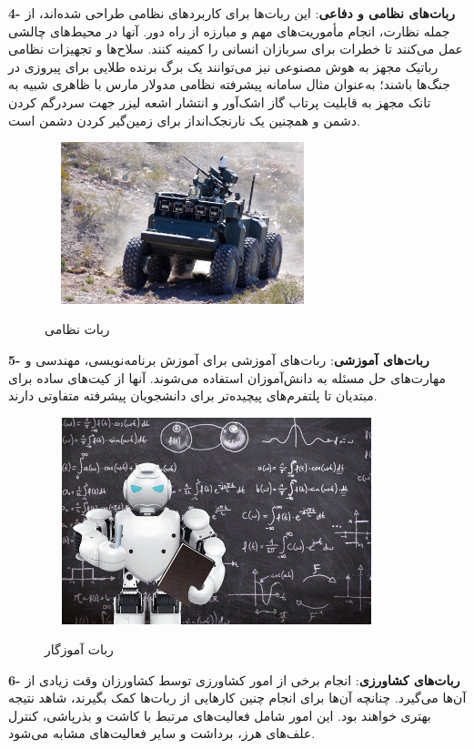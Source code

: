 \textbf{4- ربات‌های نظامی و دفاعی}:
  این ربات‌ها برای کاربردهای نظامی طراحی شده‌اند، از جمله نظارت، انجام مأموریت‌های مهم و مبارزه از راه دور. آنها در محیط‌های چالشی عمل می‌کنند تا خطرات برای سربازان انسانی را کمینه کنند.
  سلاح‌ها و تجهیزات نظامی رباتیک مجهز به هوش مصنوعی نیز می‌توانند یک برگ برنده طلایی برای پیروزی در جنگ‌ها باشند؛ به‌عنوان ‌مثال سامانه پیشرفته نظامی مدولار مارس
\unskip{} 
با ظاهری شبیه به تانک مجهز به قابلیت پرتاب گاز اشک‌آور و انتشار اشعه لیزر جهت سردرگم کردن دشمن و همچنین یک نارنجک‌انداز برای زمین‌گیر کردن دشمن است\cite{Digiato}.
    \begin{figure}[!h]
	\vspace{0.2cm}
	\centering
	\includegraphics[height=4.7cm,width=8cm]{./Images/CH1/military_robot.jpg}
	‌\caption{ربات نظامی}
	\label{ربات نظامی}
	\end{figure}
\newpage
\textbf{5- ربات‌های آموزشی}:	
  ربات‌های آموزشی برای آموزش برنامه‌نویسی، مهندسی و مهارت‌های حل مسئله به دانش‌آموزان استفاده می‌شوند. آنها از کیت‌های ساده برای مبتدیان تا پلتفرم‌های پیچیده‌تر برای دانشجویان پیشرفته متفاوتی دارند.
    \begin{figure}[!h]
	\vspace{0.2cm}
	\centering
	\includegraphics[height=6cm,width=10cm]{./Images/CH1/educational_robot.jpg}
	‌\caption{ربات آموزگار}
	\end{figure}
	
\textbf{6- ربات‌های کشاورزی}: 
  انجام برخی از امور کشاورزی توسط کشاورزان وقت زیادی از آن‌ها می‌گیرد. چنانچه آن‌ها برای انجام چنین کارهایی از ربات‌ها کمک بگیرند، شاهد نتیجه بهتری خواهند بود. این امور شامل فعالیت‌های مرتبط با کاشت و بذرپاشی، کنترل علف‌های هرز، برداشت و سایر فعالیت‌های مشابه می‌شود.
  
